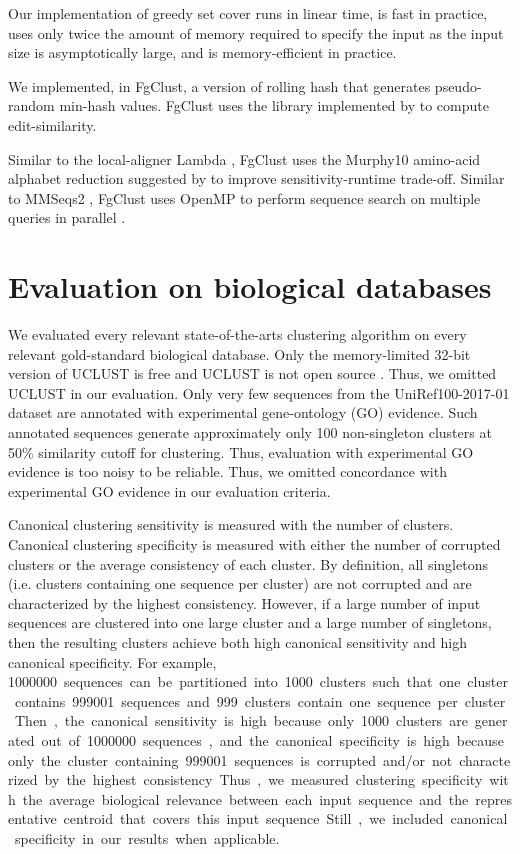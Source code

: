 \documentclass[11pt,letterpaper]{article}
\begin{document}
Our implementation of greedy set cover runs in linear time, is fast in practice, uses only twice the amount of memory required to specify the input as the input size is asymptotically large, and is memory-efficient in practice.

We implemented, in FgClust, a version of rolling hash that generates pseudo-random min-hash values.
FgClust uses the library implemented by \citet{vsovsic2017edlib} to compute edit-similarity.

Similar to the local-aligner Lambda \citep{hauswedell2014lambda}, FgClust uses the Murphy10 amino-acid alphabet reduction suggested by \citet{murphy2000simplified} to improve sensitivity-runtime trade-off.
Similar to MMSeqs2 \citep{steinegger2017mmseqs2}, FgClust uses OpenMP to perform sequence search on multiple queries in parallel \citep{dagum1998openmp}.

\section{Evaluation on biological databases}

We evaluated every relevant state-of-the-arts clustering algorithm on every relevant gold-standard biological database.
Only the memory-limited 32-bit version of UCLUST is free and UCLUST is not open source \citep{edgar2010search}.
Thus, we omitted UCLUST in our evaluation.
Only very few sequences from the UniRef100-2017-01 dataset are annotated with experimental gene-ontology (GO) evidence.   
Such annotated sequences generate approximately only 100 non-singleton clusters at 50\% similarity cutoff for clustering.
Thus, evaluation with experimental GO evidence is too noisy to be reliable.
Thus, we omitted concordance with experimental GO evidence in our evaluation criteria.

Canonical clustering sensitivity is measured with the number of clusters.
Canonical clustering specificity is measured with either the number of corrupted clusters or the average consistency of each cluster.
By definition, all singletons (i.e. clusters containing one sequence per cluster) are not corrupted and are characterized by the highest consistency.
However, if a large number of input sequences are clustered into one large cluster and a large number of singletons, then the resulting clusters achieve both high canonical sensitivity and high canonical specificity.
For example, \SI{1000000} sequences can be partitioned into \SI{1000} clusters such that one cluster contains \SI{999001} sequences and \SI{999} clusters contain one sequence per cluster.
Then, 
	the canonical sensitivity is high because only \SI{1000} clusters are generated out of \SI{1000000} sequences, 
	and the canonical specificity is high because only the cluster containing \SI{999001} sequences is corrupted and/or not characterized by the highest consistency.
Thus, we measured clustering specificity with the average biological relevance between each input sequence and the representative centroid that covers this input sequence. 
Still, we included canonical specificity in our results when applicable.
\end{document}
